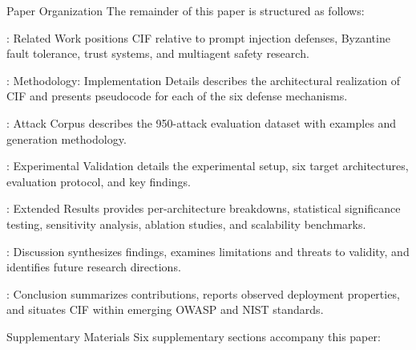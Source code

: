 \documentclass[
  ignorenonframetext,
]{beamer}
\begin{document}
\begin{frame}{Paper Organization}
\protect{}\label{paper-organization}
The remainder of this paper is structured as follows:

\textbf{}: Related Work positions CIF relative to
prompt injection defenses, Byzantine fault tolerance, trust systems, and
multiagent safety research.

\textbf{}: Methodology: Implementation Details
describes the architectural realization of CIF and presents pseudocode
for each of the six defense mechanisms.

\textbf{}: Attack Corpus describes the
950-attack evaluation dataset with examples and generation methodology.

\textbf{}: Experimental Validation details the
experimental setup, six target architectures, evaluation protocol, and
key findings.

\textbf{}: Extended Results provides
per-architecture breakdowns, statistical significance testing,
sensitivity analysis, ablation studies, and scalability benchmarks.

\textbf{}: Discussion synthesizes findings,
examines limitations and threats to validity, and identifies future
research directions.

\textbf{}: Conclusion summarizes contributions,
reports observed deployment properties, and situates CIF within emerging
OWASP and NIST standards.

\begin{block}{Supplementary Materials}
\protect{}\label{supplementary-materials}
Six supplementary sections accompany this paper:


\end{block}
\end{frame}
\end{document}
